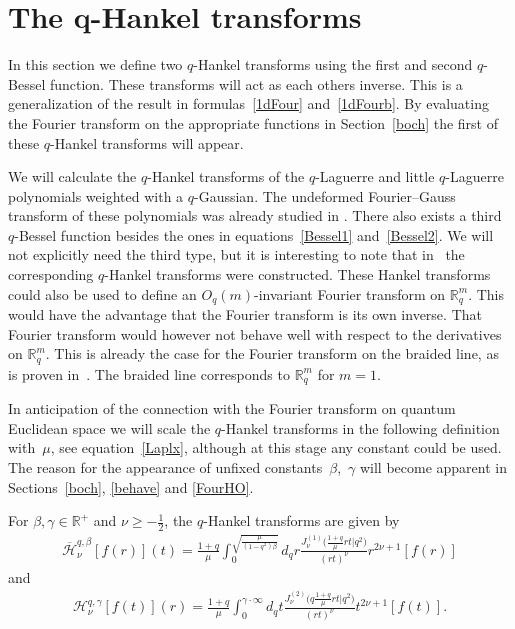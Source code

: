 \documentclass[pdftex]{sigma}
\newcommand{\mR}{\mathbb{R}}
\newcommand{\cH}{\mathcal{H}}
\numberwithin{equation}{section}
\begin{document}
\section[The $q$-Hankel transforms]{The $\boldsymbol{q}$-Hankel transforms}
\label{Hanksect}

In this section we def\/ine two $q$-Hankel transforms using the f\/irst and second $q$-Bessel function. These transforms will act as each others inverse. This is a generalization of the result in formulas~\eqref{1dFour} and~\eqref{1dFourb}. By evaluating the Fourier transform on the appropriate functions in Section~\ref{boch} the f\/irst of these $q$-Hankel transforms will appear.

We will calculate the $q$-Hankel transforms of the $q$-Laguerre and little $q$-Laguerre polynomials weighted with a $q$-Gaussian. The undeformed Fourier--Gauss transform of these polynomials was already studied in \cite{MR1479780}. There also exists a third $q$-Bessel function besides the ones in equations~\eqref{Bessel1} and~\eqref{Bessel2}. We will not explicitly need the third type, but it is interesting to note that in~\cite{MR1069750, MR2445269} the corresponding $q$-Hankel transforms were constructed. These Hankel transforms could also be used to def\/ine an $O_q(m)$-invariant Fourier transform on $\mR^m_q$. This would have the advantage that the Fourier transform is its own inverse. That Fourier transform would however not behave well with respect to the derivatives on $\mR^m_q$. This is already the case for the Fourier transform on the braided line, as is proven in~\cite{MR1069750}. The braided line corresponds to $\mR^m_q$ for $m=1$.


In anticipation of the connection with the Fourier transform on quantum Euclidean space we will scale the $q$-Hankel transforms in the following def\/inition with~$\mu$, see equation~\eqref{Laplx}, although at this stage any constant could be used. The reason for the appearance of unf\/ixed constants~$\beta$,~$\gamma$ will become apparent in Sections~\ref{boch}, \ref{behave} and \ref{FourHO}.
\begin{definition}
\label{defHankel}
For $\beta,\gamma\in\mR^+$ and $\nu\ge-\frac{1}{2}$, the $q$-Hankel transforms are given by
\begin{gather*}
\overline{\cH}_{\nu}^{q,\beta}[f(r)](t) = \frac{1+q}{\mu}\int_0^{\sqrt{\frac{\mu}{(1-q^2)\beta}}}d_qr\frac{J_\nu^{(1)}\big(\frac{1+q}{\mu}rt|q^2\big)}{(rt)^{\nu}}r^{2\nu+1}[f(r)]
\end{gather*}
and
\begin{gather*}
\cH^{q,\gamma}_{\nu}[f(t)](r) = \frac{1+q}{\mu}\int_0^{\gamma\cdot\infty}d_qt\frac{J_\nu^{(2)}\big(q\frac{1+q}{\mu}rt|q^2\big)}{(rt)^{\nu}}t^{2\nu+1}[f(t)].
\end{gather*}
\end{definition}
\end{document}
